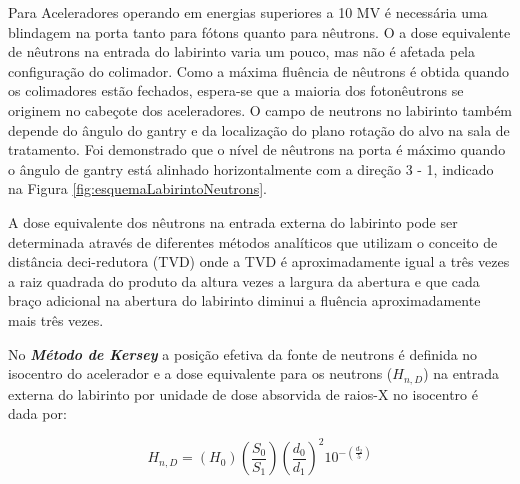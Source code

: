\documentclass[11pt,a4paper]{article}
\begin{document}
        Para Aceleradores operando em energias superiores a 10 MV é necessária uma blindagem na porta tanto para fótons quanto para nêutrons. O a dose equivalente de nêutrons na entrada do labirinto varia um pouco, mas não é afetada pela configuração do colimador. Como a máxima fluência de nêutrons é obtida quando os colimadores estão fechados, espera-se que a maioria dos fotonêutrons se originem no cabeçote dos aceleradores. O campo de neutrons no labirinto também depende do ângulo do gantry e da localização do plano rotação do alvo na sala de tratamento. Foi demonstrado que o nível de nêutrons na porta é máximo quando o ângulo de gantry está alinhado horizontalmente com a direção 3 - 1, indicado na Figura \ref{fig:esquemaLabirintoNeutrons}. 

        A dose equivalente dos nêutrons na entrada externa do labirinto pode ser determinada através de diferentes métodos analíticos que utilizam o conceito de distância deci-redutora (TVD) onde a TVD é aproximadamente igual a três vezes a raiz quadrada do produto da altura vezes a largura da abertura e que cada braço adicional na abertura do labirinto diminui a fluência aproximadamente mais três vezes. 

        No \textcolor{CarnationPink}{\textbf{\textit{Método de Kersey}}} a posição efetiva da fonte de neutrons é definida no isocentro do acelerador e a dose equivalente para os neutrons ($H_{n,D}$) na entrada externa do labirinto por unidade de dose absorvida de raios-X no isocentro é dada por:

        \begin{equation}
            H_{n,D} = (H_0) \left(\frac{S_0}{S_1}\right) \left(\frac{d_0}{d_1}\right)^2 10^{-\left(\frac{d_2}{5}\right)}
        \end{equation}
\end{document}
